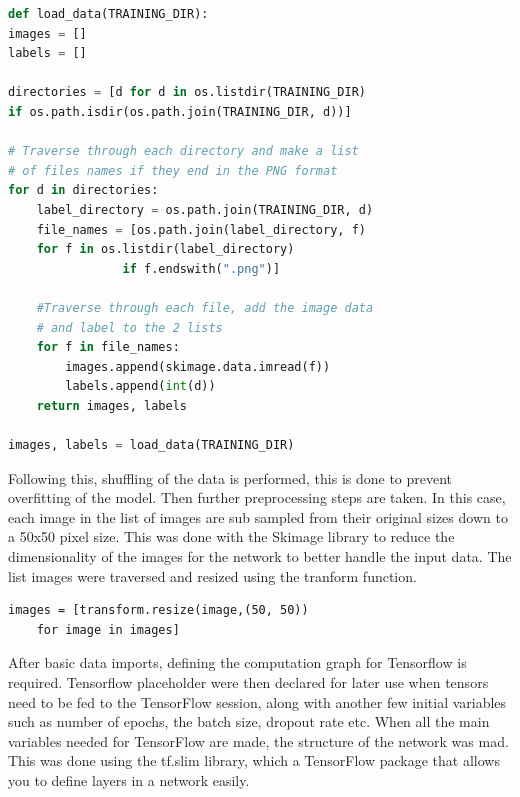 \begin{lstlisting}[language=Python, frame=single]
def load_data(TRAINING_DIR):
images = []
labels = []

directories = [d for d in os.listdir(TRAINING_DIR) 
if os.path.isdir(os.path.join(TRAINING_DIR, d))]

# Traverse through each directory and make a list
# of files names if they end in the PNG format
for d in directories:
	label_directory = os.path.join(TRAINING_DIR, d)
	file_names = [os.path.join(label_directory, f) 
	for f in os.listdir(label_directory) 
				if f.endswith(".png")]
	
	#Traverse through each file, add the image data
	# and label to the 2 lists
	for f in file_names:
		images.append(skimage.data.imread(f))
		labels.append(int(d))
	return images, labels

images, labels = load_data(TRAINING_DIR)
\end{lstlisting}
Following this, shuffling of the data is performed, this is done to prevent overfitting of the model. Then further preprocessing steps are taken. In this case, each image in the list of images are sub sampled from their original sizes down to a 50x50 pixel size. This was done with the Skimage library to reduce the dimensionality of the images for the network to better handle the input data. The list images were traversed and resized using the tranform function. 
\begin{lstlisting}[frame=single]
images = [transform.resize(image,(50, 50))
	for image in images]
\end{lstlisting}
After basic data imports, defining the computation graph for Tensorflow is required. Tensorflow placeholder were then declared for later use when tensors need to be fed to the TensorFlow session, along with another few initial variables such as number of epochs, the batch size, dropout rate etc. When all the main variables needed for TensorFlow are made, the structure of the network was mad. This was done using the tf.slim library, which a TensorFlow package that allows you to define layers in a network easily. 

